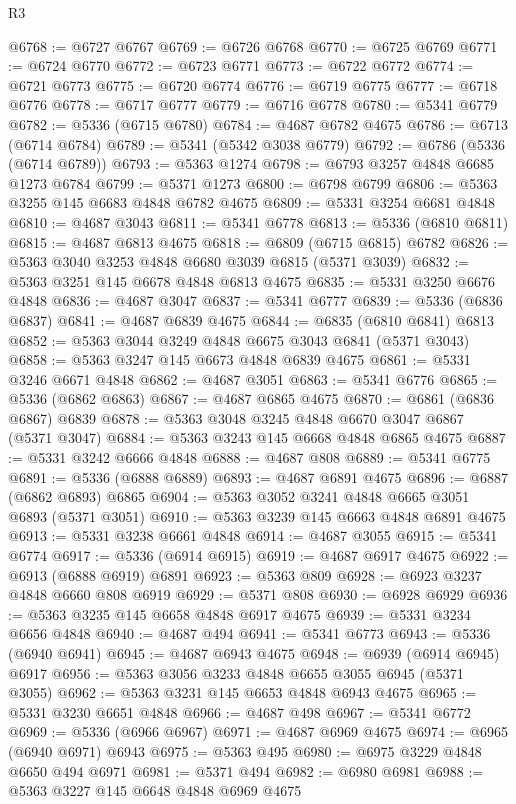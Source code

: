 \begin{lexlean}{R3}
\begin{coremodule}
@6768 := @6727 @6767
@6769 := @6726 @6768
@6770 := @6725 @6769
@6771 := @6724 @6770
@6772 := @6723 @6771
@6773 := @6722 @6772
@6774 := @6721 @6773
@6775 := @6720 @6774
@6776 := @6719 @6775
@6777 := @6718 @6776
@6778 := @6717 @6777
@6779 := @6716 @6778
@6780 := @5341 @6779
@6782 := @5336 (@6715 @6780)
@6784 := @4687 @6782 @4675
@6786 := @6713 (@6714 @6784)
@6789 := @5341 (@5342 @3038 @6779)
@6792 := @6786 (@5336 (@6714 @6789))
@6793 := @5363 @1274
@6798 := @6793 @3257 @4848 @6685 @1273 @6784
@6799 := @5371 @1273
@6800 := @6798 @6799
@6806 := @5363 @3255 @145 @6683 @4848 @6782 @4675
@6809 := @5331 @3254 @6681 @4848
@6810 := @4687 @3043
@6811 := @5341 @6778
@6813 := @5336 (@6810 @6811)
@6815 := @4687 @6813 @4675
@6818 := @6809 (@6715 @6815) @6782
@6826 := @5363 @3040 @3253 @4848 @6680 @3039 @6815 (@5371 @3039)
@6832 := @5363 @3251 @145 @6678 @4848 @6813 @4675
@6835 := @5331 @3250 @6676 @4848
@6836 := @4687 @3047
@6837 := @5341 @6777
@6839 := @5336 (@6836 @6837)
@6841 := @4687 @6839 @4675
@6844 := @6835 (@6810 @6841) @6813
@6852 := @5363 @3044 @3249 @4848 @6675 @3043 @6841 (@5371 @3043)
@6858 := @5363 @3247 @145 @6673 @4848 @6839 @4675
@6861 := @5331 @3246 @6671 @4848
@6862 := @4687 @3051
@6863 := @5341 @6776
@6865 := @5336 (@6862 @6863)
@6867 := @4687 @6865 @4675
@6870 := @6861 (@6836 @6867) @6839
@6878 := @5363 @3048 @3245 @4848 @6670 @3047 @6867 (@5371 @3047)
@6884 := @5363 @3243 @145 @6668 @4848 @6865 @4675
@6887 := @5331 @3242 @6666 @4848
@6888 := @4687 @808
@6889 := @5341 @6775
@6891 := @5336 (@6888 @6889)
@6893 := @4687 @6891 @4675
@6896 := @6887 (@6862 @6893) @6865
@6904 := @5363 @3052 @3241 @4848 @6665 @3051 @6893 (@5371 @3051)
@6910 := @5363 @3239 @145 @6663 @4848 @6891 @4675
@6913 := @5331 @3238 @6661 @4848
@6914 := @4687 @3055
@6915 := @5341 @6774
@6917 := @5336 (@6914 @6915)
@6919 := @4687 @6917 @4675
@6922 := @6913 (@6888 @6919) @6891
@6923 := @5363 @809
@6928 := @6923 @3237 @4848 @6660 @808 @6919
@6929 := @5371 @808
@6930 := @6928 @6929
@6936 := @5363 @3235 @145 @6658 @4848 @6917 @4675
@6939 := @5331 @3234 @6656 @4848
@6940 := @4687 @494
@6941 := @5341 @6773
@6943 := @5336 (@6940 @6941)
@6945 := @4687 @6943 @4675
@6948 := @6939 (@6914 @6945) @6917
@6956 := @5363 @3056 @3233 @4848 @6655 @3055 @6945 (@5371 @3055)
@6962 := @5363 @3231 @145 @6653 @4848 @6943 @4675
@6965 := @5331 @3230 @6651 @4848
@6966 := @4687 @498
@6967 := @5341 @6772
@6969 := @5336 (@6966 @6967)
@6971 := @4687 @6969 @4675
@6974 := @6965 (@6940 @6971) @6943
@6975 := @5363 @495
@6980 := @6975 @3229 @4848 @6650 @494 @6971
@6981 := @5371 @494
@6982 := @6980 @6981
@6988 := @5363 @3227 @145 @6648 @4848 @6969 @4675

\end{coremodule}
\end{lexlean}
